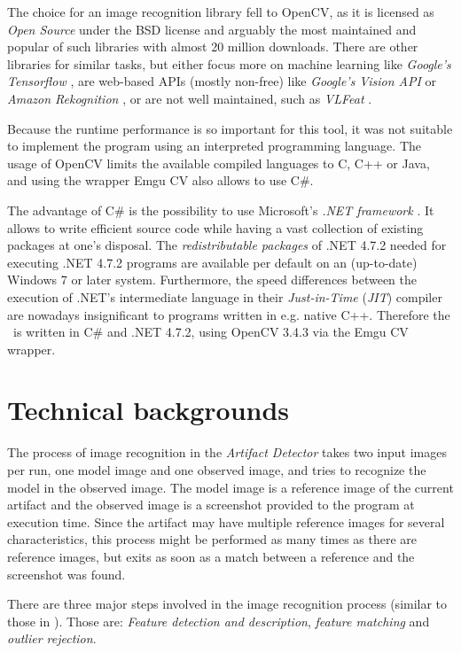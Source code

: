 The choice for an image recognition library fell to OpenCV, as it is licensed as \emph{Open Source} under the BSD license and arguably the most maintained and popular of such libraries with almost 20 million downloads. \cite{opencv_downloads} There are other libraries for similar tasks, but either focus more on machine learning like \emph{Google's Tensorflow} \cite{tensorflow}, are web-based APIs (mostly non-free) like \emph{Google's Vision API} \cite{vision_api} or \emph{Amazon Rekognition} \cite{rekognition}, or are not well maintained, such as \emph{VLFeat} \cite{vlfeat}.

Because the runtime performance is so important for this tool, it was not suitable to implement the program using an interpreted programming language. The usage of OpenCV limits the available compiled languages to C, C++ or Java, and using the wrapper Emgu CV also allows to use C\#.

The advantage of C\# is the possibility to use Microsoft's \emph{.NET framework} \cite{dotnet4_7_2}. It allows to write efficient source code while having a vast collection of existing packages at one's disposal. The \emph{redistributable packages} of .NET 4.7.2 needed for executing .NET 4.7.2 programs are available per default on an (up-to-date) Windows 7 or later system. Furthermore, the speed differences between the execution of .NET's intermediate language in their \emph{Just-in-Time} (\emph{JIT}) compiler are nowadays insignificant to programs written in e.g. native C++. Therefore the \vd~is written in C\# and .NET 4.7.2, using OpenCV 3.4.3 via the Emgu CV wrapper.

\section{Technical backgrounds}\label{sec:tech-bg}

The process of image recognition in the \emph{Artifact Detector} takes two input images per run, one model image and one observed image, and tries to recognize the model in the observed image. The model image is a reference image of the current artifact and the observed image is a screenshot provided to the program at execution time. Since the artifact may have multiple reference images for several characteristics, this process might be performed as many times as there are reference images, but exits as soon as a match between a reference and the screenshot was found.

There are three major steps involved in the image recognition process (similar to those in \cite{orb_comparison}). Those are: \emph{Feature detection and description}, \emph{feature matching} and \emph{outlier rejection}.

